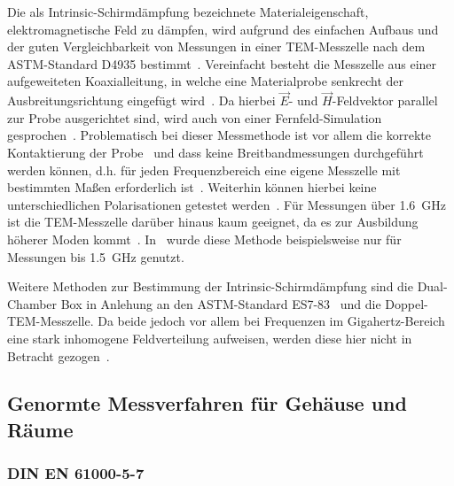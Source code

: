 Die als Intrinsic-Schirmdämpfung bezeichnete Materialeigenschaft, elektromagnetische Feld zu dämpfen, wird aufgrund des einfachen Aufbaus und der guten Vergleichbarkeit von Messungen in einer TEM-Messzelle nach dem ASTM-Standard D4935 bestimmt~\cite{ASTM_D4935, Measurement_Shielding_Textile_Materials_Free_Space_Transmission}. Vereinfacht besteht die Messzelle aus einer aufgeweiteten Koaxialleitung, in welche eine Materialprobe senkrecht der Ausbreitungsrichtung eingefügt wird~\cite{EM_Schirmung, Handbook_EMI_Vol_3}. Da hierbei $\vec E$- und $\vec H$-Feldvektor parallel zur Probe ausgerichtet sind, wird auch von einer Fernfeld-Simulation gesprochen~\cite{Techniques_Shielding_Effectiveness_Far_Field_Simulation, EMV}. Problematisch bei dieser Messmethode ist vor allem die korrekte Kontaktierung der Probe~\cite{EM_Schirmung} und dass keine Breitbandmessungen durchgeführt werden können, d.h. für jeden Frequenzbereich eine eigene Messzelle mit bestimmten Maßen erforderlich ist~\cite{Techniques_Shielding_Effectiveness_Far_Field_Simulation, EMV}. Weiterhin können hierbei keine unterschiedlichen Polarisationen getestet werden~\cite{Techniques_Shielding_Effectiveness_Far_Field_Simulation}. Für Messungen über \SI{1,6}{\giga\hertz} ist die TEM-Messzelle darüber hinaus kaum geeignet, da es zur Ausbildung höherer Moden kommt~\cite{EMV}. In~\cite{Measurement_Electromagnetic_Shielding_Effectiveness_Composite_Carbon_Nickel_Thinfilm} wurde diese Methode beispielsweise nur für Messungen bis \SI{1,5}{\giga\hertz} genutzt.
\par
\vspace{\linespace}
Weitere Methoden zur Bestimmung der Intrinsic-Schirmdämpfung sind die Dual-Chamber Box in Anlehung an den ASTM-Standard ES7-83~\cite{ASTM_ES7-83} und die Doppel-TEM-Messzelle. Da beide jedoch vor allem bei Frequenzen im Gigahertz-Bereich eine stark inhomogene Feldverteilung aufweisen, werden diese hier nicht in Betracht gezogen~\cite{EM_Schirmung, EMV}.


\subsection{Genormte Messverfahren für Gehäuse und Räume}\label{cha:2_sub_Genormte_Messverfahren}

\subsubsection{DIN EN 61000-5-7}

